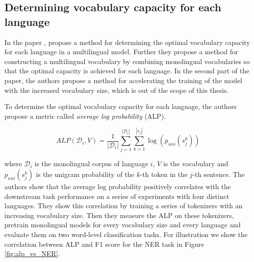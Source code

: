 




\subsection{Determining vocabulary capacity for each language}
\label{sec:zheng}

In the paper , \citeauthor{zheng_allocating_2021} propose a method for determining the optimal vocabulary capacity for each language in a multilingual model. Further they propose a method for constructing a multilingual vocabulary by combining monolingual vocabularies so that the optimal capacity is achieved for each language. In the second part of the paper, the authors propose a method for accelerating the training of the model with the increased vocabulary size, which is out of the scope of this thesis.



To determine the optimal vocabulary capacity for each language, the authors propose a metric called \textit{average log probability} (ALP). 

$$
ALP(\mathcal{D}_i, V) = \frac{1}{|\mathcal{D}_i|} \sum_{j=1}^{|\mathcal{D}_i|} \sum_{k=1}^{|s_j|} \log(p_{uni}(s^k_{j}))
$$

where $\mathcal{D}_i$ is the monolingual corpus of language $i$, $V$ is the vocabulary and $p_{uni}(s^k_{j})$ is the unigram probability of the $k$-th token in the $j$-th sentence. The authors show that the average log probability positively correlates with the downstream task performance on a series of experiments with four distinct languages. They show this correlation by training a series of tokenizers with an increasing vocabulary size. Then they measure the ALP on these tokenizers, pretrain monolingual models for every vocabulary size and every language and evaluate them on two word-level classification tasks. For illustration we show the correlation between ALP and F1 score for the NER task in Figure \ref{fig:alp_vs_NER}. 

